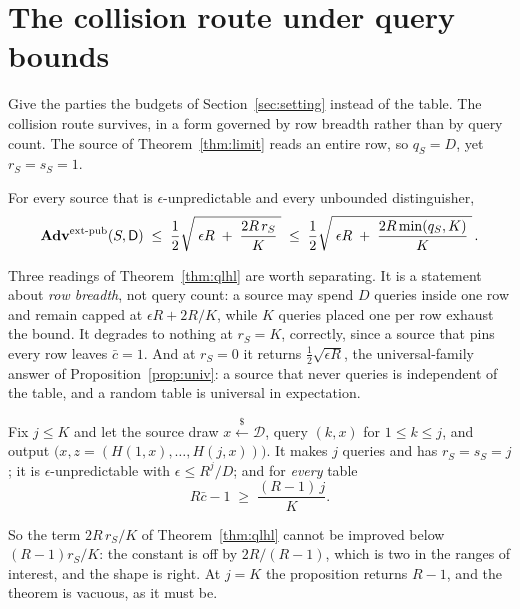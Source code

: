 \documentclass{aicr-solution}
\newcommand{\Adv}{\mathbf{Adv}}
\newcommand{\extpub}{\textup{ext-pub}}
\renewcommand{\sample}{\stackrel{{\scriptscriptstyle\$}}{\leftarrow}}
\newcommand{\calD}{\mathcal{D}}
\begin{document}
\section{The collision route under query bounds}\label{sec:rowbreadth}

Give the parties the budgets of Section~\ref{sec:setting} instead of the table. The collision route
survives, in a form governed by row breadth rather than by query count. The source of
Theorem~\ref{thm:limit} reads an entire row, so $q_S = D$, yet $r_S = s_S = 1$.
\begin{theorem}\label{thm:qlhl}
For every source that is $\epsilon$-unpredictable and every unbounded distinguisher,
\[
  \Adv^{\extpub}(S,\mathsf{D}) \;\le\; \frac12\sqrt{\;\epsilon R \;+\; \frac{2R\,r_S}{K}\;}
  \;\le\; \frac12\sqrt{\;\epsilon R \;+\; \frac{2R\min(q_S,K)}{K}\;} \, .
\]
\end{theorem}

Three readings of Theorem~\ref{thm:qlhl} are worth separating. It is a statement about \emph{row
breadth}, not query count: a source may spend $D$ queries inside one row and remain capped at
$\epsilon R + 2R/K$, while $K$ queries placed one per row exhaust the bound. It degrades to nothing
at $r_S = K$, correctly, since a source that pins every row leaves $\bar c = 1$. And at $r_S = 0$ it
returns $\tfrac12\sqrt{\epsilon R}$, the universal-family answer of
Proposition~\ref{prop:univ}: a source that never queries is independent of the table, and a random
table is universal in expectation.

\begin{proposition}\label{prop:qtight}
Fix $j \le K$ and let the source draw $x \sample \calD$, query $(k,x)$ for $1 \le k \le j$, and output
$\bigl(x, z = (H(1,x),\dots,H(j,x))\bigr)$. It makes $j$ queries and has $r_S = s_S = j$; it is
$\epsilon$-unpredictable with $\epsilon \le R^{j}/D$; and for \emph{every} table
\[
  R\bar c - 1 \;\ge\; \frac{(R-1)\,j}{K} .
\]
\end{proposition}

So the term $2R\,r_S/K$ of Theorem~\ref{thm:qlhl} cannot be improved below $(R-1)r_S/K$: the
constant is off by $2R/(R-1)$, which is two in the ranges of interest, and the shape is right. At $j = K$ the proposition
returns $R - 1$, and the theorem is vacuous, as it must be.
\end{document}
